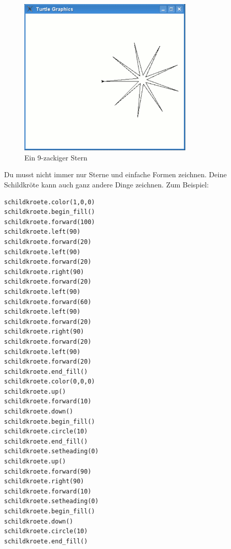 \begin{figure}
\begin{center}
\includegraphics[width=84mm]{images/figure23}
\end{center}
\caption{Ein 9-zackiger Stern}\label{fig23}
\end{figure}

Du musst nicht immer nur Sterne und einfache Formen zeichnen. Deine Schildkröte kann auch ganz andere Dinge zeichnen. Zum Beispiel:

\begin{Verbatim}[frame=single]
schildkroete.color(1,0,0)
schildkroete.begin_fill()
schildkroete.forward(100)
schildkroete.left(90)
schildkroete.forward(20)
schildkroete.left(90)
schildkroete.forward(20)
schildkroete.right(90)
schildkroete.forward(20)
schildkroete.left(90)
schildkroete.forward(60)
schildkroete.left(90)
schildkroete.forward(20)
schildkroete.right(90)
schildkroete.forward(20)
schildkroete.left(90)
schildkroete.forward(20)
schildkroete.end_fill()
schildkroete.color(0,0,0)
schildkroete.up()
schildkroete.forward(10)
schildkroete.down()
schildkroete.begin_fill()
schildkroete.circle(10)
schildkroete.end_fill()
schildkroete.setheading(0)
schildkroete.up()
schildkroete.forward(90)
schildkroete.right(90)
schildkroete.forward(10)
schildkroete.setheading(0)
schildkroete.begin_fill()
schildkroete.down()
schildkroete.circle(10)
schildkroete.end_fill()
\end{Verbatim}

